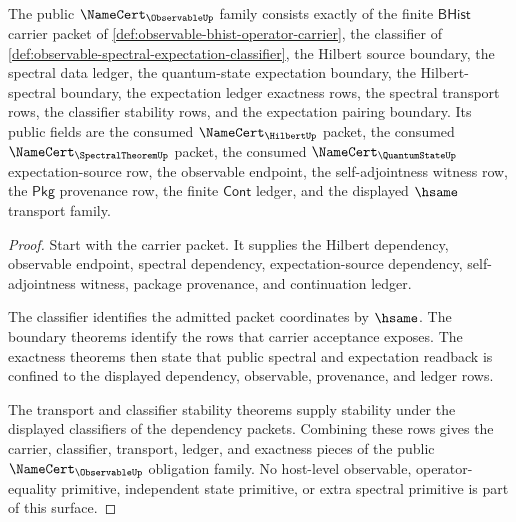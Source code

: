\begin{theorem}
\label{thm:observable-public-row-family}
The public $\NameCert_{\ObservableUp}$ family consists exactly of the finite
$\mathsf{BHist}$ carrier packet of
\autoref{def:observable-bhist-operator-carrier}, the classifier of
\autoref{def:observable-spectral-expectation-classifier}, the Hilbert source
boundary, the spectral data ledger, the quantum-state expectation boundary,
the Hilbert-spectral boundary, the expectation ledger exactness rows, the
spectral transport rows, the classifier stability rows, and the expectation
pairing boundary. Its public fields are the consumed
$\NameCert_{\HilbertUp}$ packet, the consumed
$\NameCert_{\SpectralTheoremUp}$ packet, the consumed
$\NameCert_{\QuantumStateUp}$ expectation-source row, the observable endpoint,
the self-adjointness witness row, the $\mathsf{Pkg}$ provenance row, the
finite $\mathsf{Cont}$ ledger, and the displayed $\hsame$ transport family.
\end{theorem}
\begin{proof}
Start with the carrier packet. It supplies the Hilbert dependency, observable
endpoint, spectral dependency, expectation-source dependency,
self-adjointness witness, package provenance, and continuation ledger.

The classifier identifies the admitted packet coordinates by $\hsame$. The
boundary theorems identify the rows that carrier acceptance exposes. The
exactness theorems then state that public spectral and expectation readback
is confined to the displayed dependency, observable, provenance, and ledger
rows.

The transport and classifier stability theorems supply stability under the
displayed classifiers of the dependency packets. Combining these rows gives
the carrier, classifier, transport, ledger, and exactness pieces of the
public $\NameCert_{\ObservableUp}$ obligation family. No host-level
observable, operator-equality primitive, independent state primitive, or
extra spectral primitive is part of this surface.
\end{proof}

